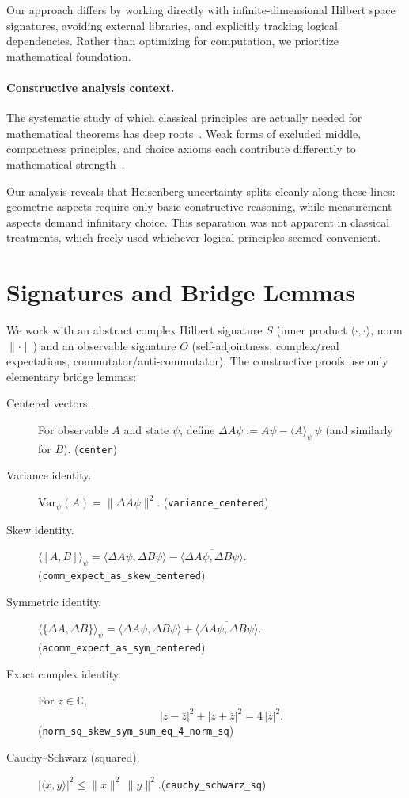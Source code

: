 \documentclass[11pt]{article}
\newcommand{\lean}[1]{\texttt{#1}}
\newcommand{\C}{\mathbb{C}}
\newcommand{\ip}[2]{\langle #1, #2 \rangle}
\newcommand{\E}[1]{\langle #1 \rangle}
\newcommand{\comm}[2]{[#1, #2]}
\newcommand{\acomm}[2]{\{#1, #2\}} %
\newcommand{\absC}[1]{\left| #1 \right|}
\newcommand{\abssq}[1]{\absC{#1}^{2}}
\newcommand{\Var}{\mathrm{Var}}
\theoremstyle{plain}
\theoremstyle{definition}
\theoremstyle{remark}
\begin{document}
Our approach differs by working directly with infinite-dimensional Hilbert space signatures, avoiding external libraries, and explicitly tracking logical dependencies. Rather than optimizing for computation, we prioritize mathematical foundation.

\paragraph{Constructive analysis context.}
The systematic study of which classical principles are actually needed for mathematical theorems has deep roots~\cite{BishopBridges,BridgesRichman,TroelstraVanDalen}. Weak forms of excluded middle, compactness principles, and choice axioms each contribute differently to mathematical strength~\cite{HowardRubin}.

Our analysis reveals that Heisenberg uncertainty splits cleanly along these lines: geometric aspects require only basic constructive reasoning, while measurement aspects demand infinitary choice. This separation was not apparent in classical treatments, which freely used whichever logical principles seemed convenient.

\section{Signatures and Bridge Lemmas}
\label{sec:signatures-bridges}

We work with an abstract complex Hilbert signature $S$ (inner product $\ip{\cdot}{\cdot}$, norm $\|\cdot\|$) and an observable signature $O$ (self-adjointness, complex/real expectations, commutator/anti-commutator). The constructive proofs use only elementary bridge lemmas:

\begin{description}
  \item[Centered vectors.] For observable $A$ and state $\psi$, define
  $\Delta A\psi := A\psi - \E{A}_\psi\,\psi$ (and similarly for $B$). \hfill{\small(\lean{center})}
  \item[Variance identity.] $\Var_\psi(A) = \|\Delta A\psi\|^2$. \hfill{\small(\lean{variance\_centered})}
  \item[Skew identity.] $\E{\comm{A}{B}}_\psi = \ip{\Delta A\psi}{\Delta B\psi} - \overline{\ip{\Delta A\psi}{\Delta B\psi}}$. \hfill{\small(\lean{comm\_expect\_as\_skew\_centered})}
  \item[Symmetric identity.] $\E{\acomm{\Delta A}{\Delta B}}_\psi = \ip{\Delta A\psi}{\Delta B\psi} + \overline{\ip{\Delta A\psi}{\Delta B\psi}}$. \hfill{\small(\lean{acomm\_expect\_as\_sym\_centered})}
  \item[Exact complex identity.] For $z\in\C$,
  \[
    \abssq{z-\bar z} + \abssq{z+\bar z} = 4\,\abssq{z}.
  \]
  \hfill{\small(\lean{norm\_sq\_skew\_sym\_sum\_eq\_4\_norm\_sq})}
  \item[Cauchy--Schwarz (squared).] $\abssq{\ip{x}{y}} \le \|x\|^2\,\|y\|^2$.\hfill{\small(\lean{cauchy\_schwarz\_sq})}
\end{description}
\end{document}
